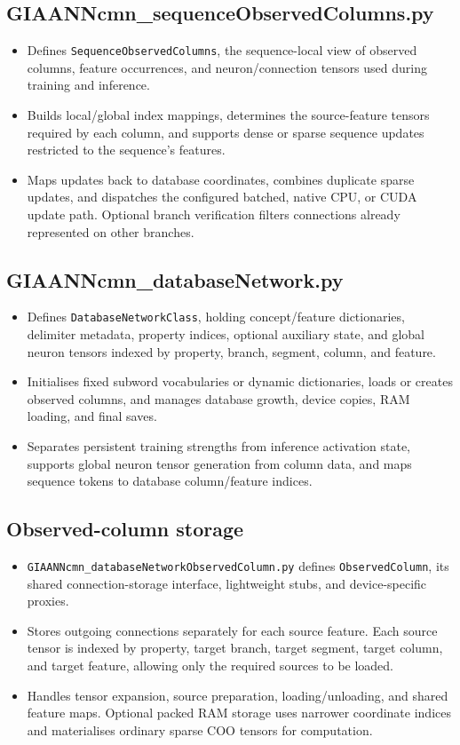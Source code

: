 \subsection{GIAANNcmn\_sequenceObservedColumns.py}
\begin{itemize}
	\item Defines \texttt{SequenceObservedColumns}, the sequence-local view of observed columns, feature occurrences, and neuron/connection tensors used during training and inference.
	\item Builds local/global index mappings, determines the source-feature tensors required by each column, and supports dense or sparse sequence updates restricted to the sequence's features.
	\item Maps updates back to database coordinates, combines duplicate sparse updates, and dispatches the configured batched, native CPU, or CUDA update path. Optional branch verification filters connections already represented on other branches.
\end{itemize}

\subsection{GIAANNcmn\_databaseNetwork.py}
\begin{itemize}
	\item Defines \texttt{DatabaseNetworkClass}, holding concept/feature dictionaries, delimiter metadata, property indices, optional auxiliary state, and global neuron tensors indexed by property, branch, segment, column, and feature.
	\item Initialises fixed subword vocabularies or dynamic dictionaries, loads or creates observed columns, and manages database growth, device copies, RAM loading, and final saves.
	\item Separates persistent training strengths from inference activation state, supports global neuron tensor generation from column data, and maps sequence tokens to database column/feature indices.
\end{itemize}

\subsection{Observed-column storage}
\begin{itemize}
	\item \texttt{GIAANNcmn\_databaseNetworkObservedColumn.py} defines \texttt{ObservedColumn}, its shared connection-storage interface, lightweight stubs, and device-specific proxies.
	\item Stores outgoing connections separately for each source feature. Each source tensor is indexed by property, target branch, target segment, target column, and target feature, allowing only the required sources to be loaded.
	\item Handles tensor expansion, source preparation, loading/unloading, and shared feature maps. Optional packed RAM storage uses narrower coordinate indices and materialises ordinary sparse COO tensors for computation.
\end{itemize}

